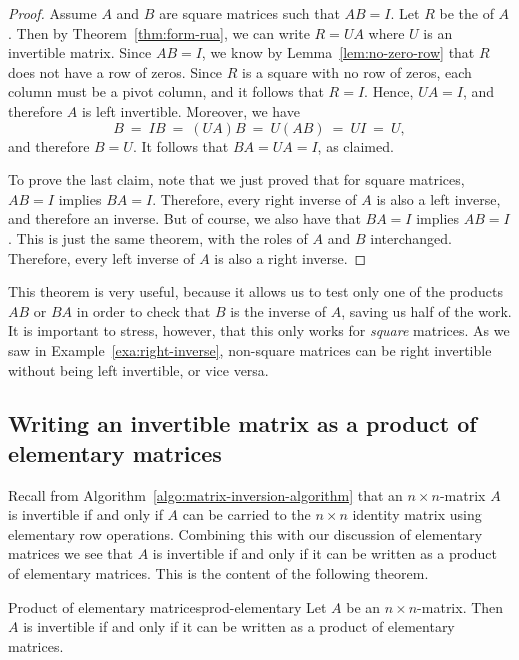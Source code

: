 \documentclass{ximera}
\begin{document}
\begin{proof}
  Assume $A$ and $B$ are square matrices such that $AB=I$. Let $R$ be
  the {\rref} of $A$. Then by Theorem~\ref{thm:form-rua}, we can write
  $R=UA$ where $U$ is an invertible matrix. Since $AB=I$, we know by
  Lemma~\ref{lem:no-zero-row} that $R$ does not have a row of
  zeros. Since $R$ is a square {\rref} with no row of zeros, each
  column must be a pivot column, and it follows that $R=I$. Hence,
  $UA=I$, and therefore $A$ is left invertible. Moreover, we have
  \begin{equation*}
    B ~=~ IB ~=~ (UA)B ~=~ U(AB) ~=~ UI ~=~ U,
  \end{equation*}
  and therefore $B=U$. It follows that $BA=UA=I$, as claimed.

  To prove the last claim, note that we just proved that for square
  matrices, $AB=I$ implies $BA=I$. Therefore, every right inverse of
  $A$ is also a left inverse, and therefore an inverse. But of course,
  we also have that $BA=I$ implies $AB=I$. This is just the same
  theorem, with the roles of $A$ and $B$ interchanged. Therefore,
  every left inverse of $A$ is also a right inverse.
\end{proof}

This theorem is very useful, because it allows us to test only one of
the products $AB$ or $BA$ in order to check that $B$ is the inverse of
$A$, saving us half of the work. It is important to stress, however,
that this only works for {\em square} matrices. As we saw in
Example~\ref{exa:right-inverse}, non-square matrices can be right
invertible without being left invertible, or vice versa.

\subsection*{Writing an invertible matrix as a product of elementary matrices}

Recall from Algorithm~\ref{algo:matrix-inversion-algorithm} that an
$n\times n$-matrix $A$ is invertible if and only if $A$ can be carried
to the $n\times n$ identity matrix using elementary row
operations. Combining this with our discussion of elementary matrices
we see that $A$ is invertible if and only if it can be written as a
product of elementary matrices. This is the content of the following
theorem.

\begin{theorem}{Product of elementary matrices}{prod-elementary}
  Let $A$ be an $n \times n$-matrix. Then $A$ is invertible if and
  only if it can be written as a product of elementary matrices.
\end{theorem}
\end{document}

